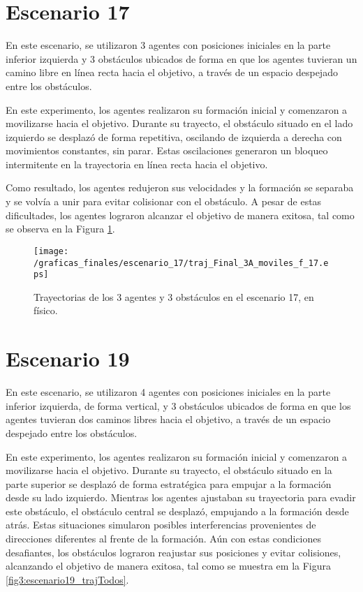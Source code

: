 \newpage
\section{Escenario 17}
En este escenario, se utilizaron 3 agentes con posiciones iniciales en la parte inferior izquierda y 3 obstáculos ubicados de forma en que los agentes tuvieran un camino libre en línea recta hacia el objetivo, a través de un espacio despejado entre los obstáculos.

En este experimento, los agentes realizaron su formación inicial y comenzaron a movilizarse hacia el objetivo. Durante su trayecto, el obstáculo situado en el lado izquierdo se desplazó de forma repetitiva, oscilando de izquierda a derecha con movimientos constantes, sin parar. Estas oscilaciones generaron un bloqueo intermitente en la trayectoria en línea recta hacia el objetivo.

Como resultado, los agentes redujeron sus velocidades y la formación se separaba y se volvía a unir para evitar colisionar con el obstáculo. A pesar de estas dificultades, los agentes lograron alcanzar el objetivo de manera exitosa, tal como se observa en la Figura \ref{fig3:escenario17_trajTodos}.

\begin{figure}[H]
	\centering
	\texttt{[image: /graficas\_finales/escenario\_17/traj\_Final\_3A\_moviles\_f\_17.eps]}
	\caption{Trayectorias de los 3 agentes y 3 obstáculos en el escenario 17, en físico.}
	\label{fig3:escenario17_trajTodos}
\end{figure}

\newpage
\section{Escenario 19}
En este escenario, se utilizaron 4 agentes con posiciones iniciales en la parte inferior izquierda, de forma vertical, y 3 obstáculos ubicados de forma en que los agentes tuvieran dos caminos libres hacia el objetivo, a través de un espacio despejado entre los obstáculos.

En este experimento, los agentes realizaron su formación inicial y comenzaron a movilizarse hacia el objetivo. Durante su trayecto, el obstáculo situado en la parte superior se desplazó de forma estratégica para empujar a la formación desde su lado izquierdo. Mientras los agentes ajustaban su trayectoria para evadir este obstáculo, el obstáculo central se desplazó, empujando a la formación desde atrás. Estas situaciones simularon posibles interferencias provenientes de direcciones diferentes al frente de la formación. Aún con estas condiciones desafiantes, los obstáculos lograron reajustar sus posiciones y evitar colisiones, alcanzando el objetivo de manera exitosa, tal como se muestra em la Figura \ref{fig3:escenario19_trajTodos}.


